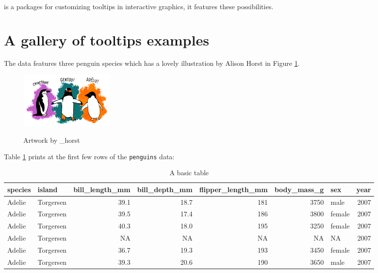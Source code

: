  is a packages for customizing tooltips in interactive graphics, it features these possibilities.

\section{A gallery of tooltips examples}\label{a-gallery-of-tooltips-examples}

The  data \citep{palmerpenguins} features three penguin species which has a lovely illustration by Alison Horst in Figure \ref{fig:penguins-alison}.

\begin{figure}
\includegraphics[width=1\linewidth,height=0.3\textheight,alt={A picture of three different penguins with their species: Chinstrap, Gentoo, and Adelie. }]{figures/penguins} \caption{Artwork by \@allison\_horst}\label{fig:penguins-alison}
\end{figure}

Table \ref{tab:penguins-tab-static} prints at the first few rows of the \texttt{penguins} data:

\begin{table}
\centering
\caption{\label{tab:penguins-tab-static}A basic table}
\centering
\fontsize{7}{9}\selectfont
\begin{tabular}[t]{l|l|r|r|r|r|l|r}
\hline
species & island & bill\_length\_mm & bill\_depth\_mm & flipper\_length\_mm & body\_mass\_g & sex & year\\
\hline
Adelie & Torgersen & 39.1 & 18.7 & 181 & 3750 & male & 2007\\
\hline
Adelie & Torgersen & 39.5 & 17.4 & 186 & 3800 & female & 2007\\
\hline
Adelie & Torgersen & 40.3 & 18.0 & 195 & 3250 & female & 2007\\
\hline
Adelie & Torgersen & NA & NA & NA & NA & NA & 2007\\
\hline
Adelie & Torgersen & 36.7 & 19.3 & 193 & 3450 & female & 2007\\
\hline
Adelie & Torgersen & 39.3 & 20.6 & 190 & 3650 & male & 2007\\
\hline
\end{tabular}
\end{table}

